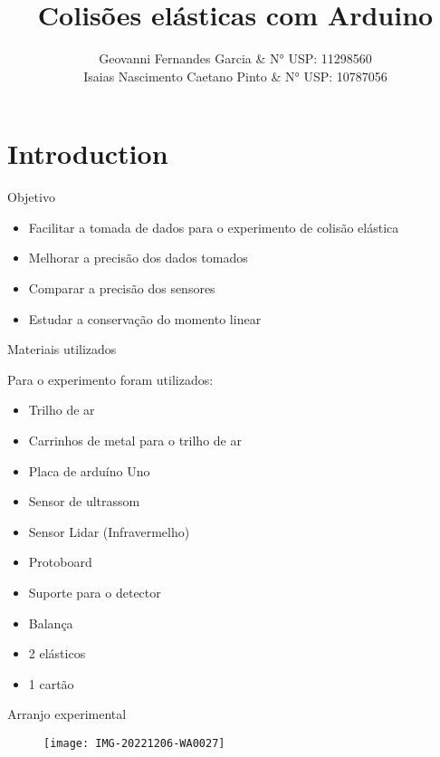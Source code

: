 \documentclass{beamer}
\title{Colisões elásticas com Arduino}
\author{Geovanni Fernandes Garcia & N° USP: 11298560\\
        Isaias Nascimento Caetano Pinto & N° USP:  10787056}
\date{}
\begin{document}
\maketitle 

\section{Introduction}

\begin{frame}{Objetivo}
    
    \begin{itemize}
        \item Facilitar a tomada de dados para o experimento de colisão elástica
        \item Melhorar a precisão dos dados tomados
        \item Comparar a precisão dos sensores
        \item Estudar a conservação do momento linear
    \end{itemize}
    
\end{frame}

\begin{frame}{Materiais utilizados}

    Para o experimento foram utilizados:
    
    \begin{itemize}
        \item Trilho de ar
        \item Carrinhos de metal para o trilho de ar
        \item Placa de arduíno Uno
        \item Sensor de ultrassom
        \item Sensor Lidar (Infravermelho)
        \item Protoboard
        \item Suporte para o detector
        \item Balança
        \item 2 elásticos
        \item 1 cartão
    \end{itemize}
    
\end{frame}

\begin{frame}{Arranjo experimental}

    \begin{figure}
  \texttt{[image: IMG-20221206-WA0027]}
  
\end{figure}

    
\end{frame}
\end{document}
